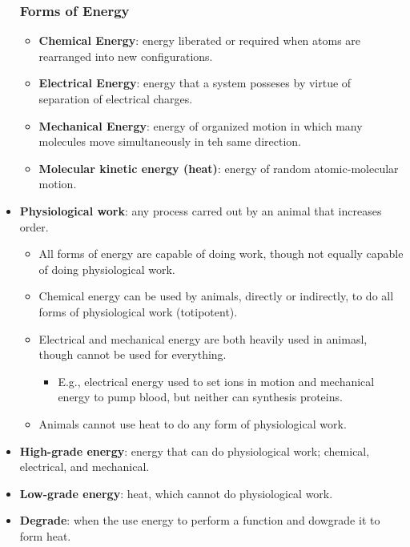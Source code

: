 \documentclass[12pt,a4paper]{article}
\begin{document}
\begin{itemize}
    \subsubsection{Forms of Energy}
    \begin{itemize}
        \item \textbf{Chemical Energy}: energy liberated or required when atoms are rearranged into new configurations.
        \item \textbf{Electrical Energy}: energy that a system posseses by virtue of separation of electrical charges.
        \item \textbf{Mechanical Energy}: energy of organized motion in which many molecules move simultaneously in teh same direction.
        \item \textbf{Molecular kinetic energy (heat)}: energy of random atomic-molecular motion.  
    \end{itemize}
    \item \textbf{Physiological work}: any process carred out by an animal that increases order. 
        \begin{itemize}
            \item All forms of energy are capable of doing work, though not equally capable of doing physiological work.
            \item Chemical energy can be used by animals, directly or indirectly, to do {\color{o-Sun}all forms} of physiological work (totipotent).
            \item Electrical and mechanical energy are both heavily used in animasl, though cannot be used for everything.
                \begin{itemize}
                    \item E.g., electrical energy used to set ions in motion and mechanical energy to pump blood, but neither can synthesis proteins.
                \end{itemize}
            \item Animals {\color{o-Sun}cannot use heat to do any form of physiological work}.
        \end{itemize}
    \item \textbf{High-grade energy}: energy that can do physiological work; chemical, electrical, and mechanical.
    \item \textbf{Low-grade energy}: heat, which cannot do physiological work.
    \item \textbf{Degrade}: when the use energy to perform a function and dowgrade it to form heat.

\end{itemize}
\end{document}
